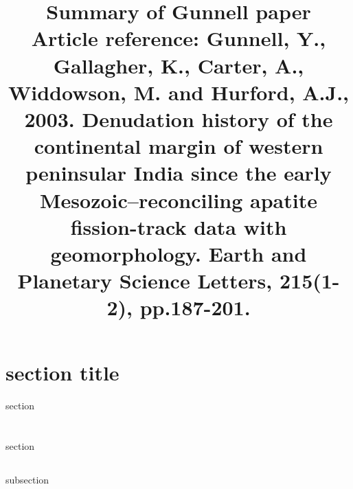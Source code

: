 \documentclass[11pt, oneside]{article}   	%
\title{Summary of Gunnell paper \\
\small Article reference: Gunnell, Y., Gallagher, K., Carter, A., Widdowson, M. and Hurford, A.J., 2003. Denudation history of the continental margin of western peninsular India since the early Mesozoic–reconciling apatite fission-track data with geomorphology. Earth and Planetary Science Letters, 215(1-2), pp.187-201.}
\date{}							%
\begin{document}
\maketitle
\section{section title}
section
\section{}
section
\subsection{}
subsection
\end{document}
